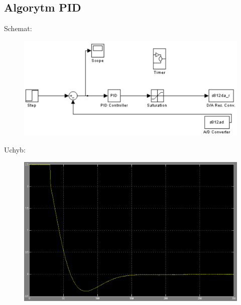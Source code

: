 \documentclass[a4paper]{article}
\begin{document}
		\subsection{Algorytm PID}
			Schemat:
			\begin{figure}[H]
				\centering
				\includegraphics[width=\textwidth]{./img/PID_alg.png}
			\end{figure}
			\newpage
			Uchyb:
			\begin{figure}[H]
				\centering
				\includegraphics[width=\textwidth]{./img/PID_error.png}
			\end{figure}
\end{document}
